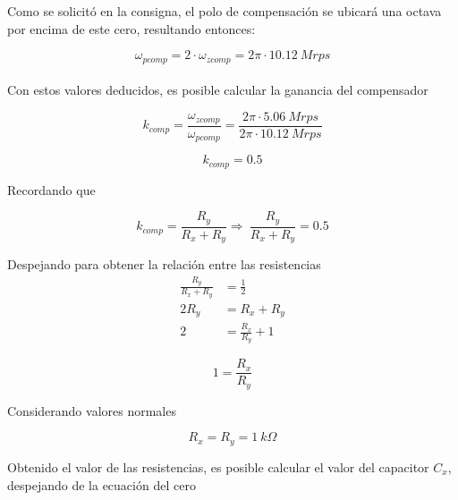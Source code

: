 \hspace{1mm} Como se solicitó en la consigna, el polo de compensación se ubicará una octava por encima de este cero, resultando entonces:

\begin{equation}
    \omega _{pcomp} = 2\cdot\omega _{zcomp} = 2\pi \cdot 10.12~Mrps 
\end{equation}
\\
\hspace{1mm} Con estos valores deducidos, es posible calcular la ganancia del compensador

\begin{equation}
    k_{comp} = \frac{\omega_{zcomp}}{\omega _{pcomp}} = \frac{2\pi \cdot 5.06~Mrps}{2\pi \cdot 10.12~Mrps}
\end{equation}

\begin{equation}
    \boxed{
    k_{comp} = 0.5
    }
\end{equation}

\hspace{1mm} Recordando que

\begin{equation}
    k_{comp} = \frac{R_y}{R_x + R_y}  \Longrightarrow  ~ \frac{R_y}{R_x + R_y} = 0.5
\end{equation}

\hspace{1mm} Despejando para obtener la relación entre las resistencias
\begin{align}
    \frac{R_y}{R_x + R_y} &= \frac{1}{2}        \\
                     2R_y &= R_x + R_y           \\
                        2 &= \frac{R_x}{R_y} + 1
\end{align}

\begin{equation}
    \boxed{
    1 = \frac{R_x}{R_y}
    }
\end{equation}

\hspace{1mm} Considerando valores normales 

\begin{equation}
    \boxed{
    R_x = R_y = 1~k\Omega
    }
\end{equation}

\hspace{1mm} Obtenido el valor de las resistencias, es posible calcular el valor del capacitor $C_x$, despejando de la ecuación del cero 

